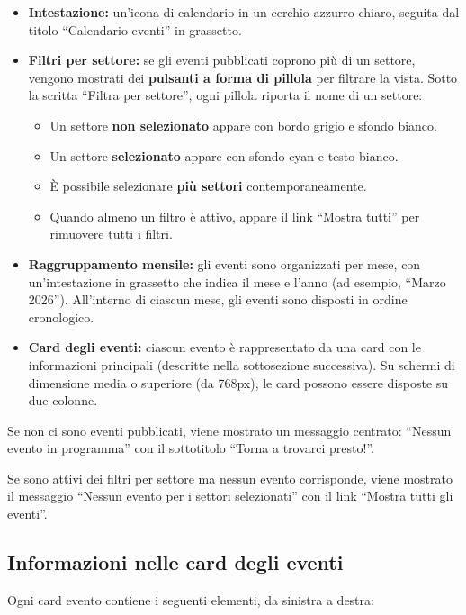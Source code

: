 \documentclass[a4paper,11pt,oneside]{book}
\begin{document}
\begin{itemize}[leftmargin=1.5em]
  \item \textbf{Intestazione:} un'icona di calendario in un cerchio azzurro chiaro, seguita dal titolo ``Calendario eventi'' in grassetto.
  \item \textbf{Filtri per settore:} se gli eventi pubblicati coprono pi\`u di un settore, vengono mostrati dei \textbf{pulsanti a forma di pillola} per filtrare la vista. Sotto la scritta ``Filtra per settore'', ogni pillola riporta il nome di un settore:
    \begin{itemize}
      \item Un settore \textbf{non selezionato} appare con bordo grigio e sfondo bianco.
      \item Un settore \textbf{selezionato} appare con sfondo \textcolor{namoCyan}{cyan} e testo bianco.
      \item \`E possibile selezionare \textbf{pi\`u settori} contemporaneamente.
      \item Quando almeno un filtro \`e attivo, appare il link ``Mostra tutti'' per rimuovere tutti i filtri.
    \end{itemize}
  \item \textbf{Raggruppamento mensile:} gli eventi sono organizzati per mese, con un'intestazione in grassetto che indica il mese e l'anno (ad esempio, ``Marzo 2026''). All'interno di ciascun mese, gli eventi sono disposti in ordine cronologico.
  \item \textbf{Card degli eventi:} ciascun evento \`e rappresentato da una card con le informazioni principali (descritte nella sottosezione successiva). Su schermi di dimensione media o superiore (da 768px), le card possono essere disposte su due colonne.
\end{itemize}

Se non ci sono eventi pubblicati, viene mostrato un messaggio centrato: ``Nessun evento in programma'' con il sottotitolo ``Torna a trovarci presto!''.

Se sono attivi dei filtri per settore ma nessun evento corrisponde, viene mostrato il messaggio ``Nessun evento per i settori selezionati'' con il link ``Mostra tutti gli eventi''.

\subsection{Informazioni nelle card degli eventi}
\label{sec:card-evento}

Ogni card evento contiene i seguenti elementi, da sinistra a destra:
\end{document}
